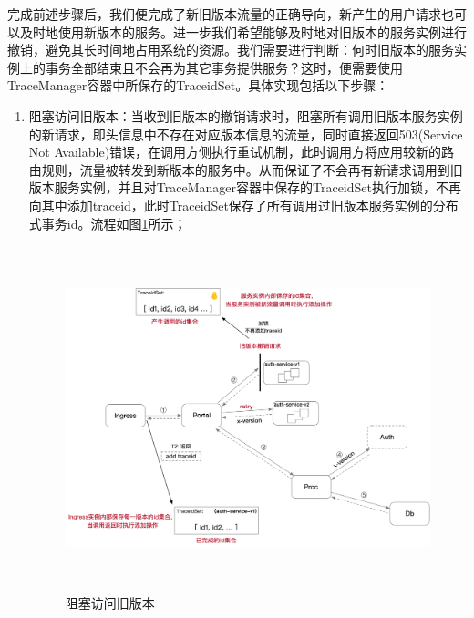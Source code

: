 \documentclass[a4paper, 12pt]{article}
\theoremstyle{definition}
\begin{document}
完成前述步骤后，我们便完成了新旧版本流量的正确导向，新产生的用户请求也可以及时地使用新版本的服务。进一步我们希望能够及时地对旧版本的服务实例进行撤销，避免其长时间地占用系统的资源。我们需要进行判断：何时旧版本的服务实例上的事务全部结束且不会再为其它事务提供服务？这时，便需要使用TraceManager容器中所保存的TraceidSet。具体实现包括以下步骤：
\begin{enumerate}
	\item 阻塞访问旧版本：当收到旧版本的撤销请求时，阻塞所有调用旧版本服务实例的新请求，即头信息中不存在对应版本信息的流量，同时直接返回503(Service Not Available)错误，在调用方侧执行重试机制，此时调用方将应用较新的路由规则，流量被转发到新版本的服务中。从而保证了不会再有新请求调用到旧版本服务实例，并且对TraceManager容器中保存的TraceidSet执行加锁，不再向其中添加traceid，此时TraceidSet保存了所有调用过旧版本服务实例的分布式事务id。流程如图\ref{fig:block_and_retry}所示；
	\begin{figure}[!ht]
	 \centering
	 \includegraphics[height=10cm]{images/block_and_retry.png}
	 \caption{阻塞访问旧版本}
	 \label{fig:block_and_retry}
	\end{figure}


\end{enumerate}
\end{document}

